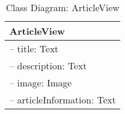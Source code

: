 \begin{table}[H]
\centering
\caption{Class Diagram: ArticleView}

\hspace{1em}
\renewcommand{\arraystretch}{1.7}

\begin{tabular}{|l|}
\hline
\textbf{ArticleView} \\
\hline
– title: Text \\
– description: Text \\
– image: Image \\
– articleInformation: Text \\
\hline
\end{tabular}
\end{table}
